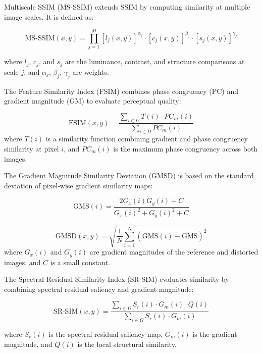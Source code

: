 Multiscale SSIM (MS-SSIM) extends SSIM by computing similarity at multiple image scales. It is defined as:

\begin{equation}
\text{MS-SSIM}(x, y) = \prod_{j=1}^{M} {[l_j(x, y)]}^{\alpha_j} \cdot {[c_j(x, y)]}^{\beta_j} \cdot {[s_j(x, y)]}^{\gamma_j}
\end{equation}

where $l_j$, $c_j$, and $s_j$ are the luminance, contrast, and structure comparisons at scale $j$, and $\alpha_j$, $\beta_j$, $\gamma_j$ are weights.

The Feature Similarity Index (FSIM) combines phase congruency (PC) and gradient magnitude (GM) to evaluate perceptual quality:

\begin{equation}
\text{FSIM}(x, y) = \frac{\sum_{i \in \Omega} T(i) \cdot PC_m(i)}{\sum_{i \in \Omega} PC_m(i)}
\end{equation}
where $T(i)$ is a similarity function combining gradient and phase congruency similarity at pixel $i$, and $PC_m(i)$ is the maximum phase congruency across both images.

The Gradient Magnitude Similarity Deviation (GMSD) is based on the standard deviation of pixel-wise gradient similarity maps:

\begin{equation}
\text{GMS}(i) = \frac{2G_x(i) G_y(i) + C}{{G_x(i)}^2 + {G_y(i)}^2 + C}
\end{equation}

\begin{equation}
\text{GMSD}(x, y) = \sqrt{\frac{1}{N} \sum_{i=1}^{N} {\left( \text{GMS}(i) - \overline{\text{GMS}} \right)}^2}
\end{equation}
where $G_x(i)$ and $G_y(i)$ are gradient magnitudes of the reference and distorted images, and $C$ is a small constant.

The Spectral Residual Similarity Index (SR-SIM) evaluates similarity by combining spectral residual saliency and gradient magnitude:

\begin{equation}
\text{SR-SIM}(x, y) = \frac{\sum_{i \in \Omega} S_r(i) \cdot G_m(i) \cdot Q(i)}{\sum_{i \in \Omega} S_r(i) \cdot G_m(i)}
\end{equation}

where $S_r(i)$ is the spectral residual saliency map, $G_m(i)$ is the gradient magnitude, and $Q(i)$ is the local structural similarity.

